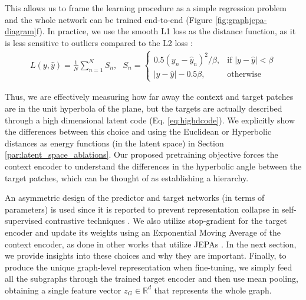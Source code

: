 \documentclass{article} \usepackage{iclr2024_conference,times}
\begin{document}
This allows us to frame the learning procedure as a simple regression problem and the whole network can be trained end-to-end (Figure \ref{fig:graphjepa-diagram}f). In practice, we use the smooth L1 loss as the distance function, as it is less sensitive to outliers compared to the L2 loss \citep{girshick2015fast}:
\begin{gather} \label{eq:loss-fn}
    L(y, \hat{y}) = \frac{1}{N} \sum_{n=1}^N S_n,~~~S_n = \begin{cases}
    0.5(y_n - \hat{y}_n)^2 / \beta, & \text{if } |y - \hat{y}| < \beta \\
    |y - \hat{y}| - 0.5\beta, & \text{otherwise}
\end{cases}
\end{gather}

Thus, we are effectively measuring how far away the context and target patches are in the unit hyperbola of the plane, but the targets are actually described through a high dimensional latent code (Eq. \ref{eq:highdcode}). We explicitly show the differences between this choice and using the Euclidean or Hyperbolic distances as energy functions (in the latent space) in Section \ref{par:latent_space_ablations}. Our proposed pretraining objective forces the context encoder to understand the differences in the hyperbolic angle between the target patches, which can be thought of as establishing a hierarchy. 

An asymmetric design of the predictor and target networks (in terms of parameters) is used since it is reported to prevent representation collapse in self-supervised contrastive techniques \citep{chen2020simple, baevski2022data2vec}. We also utilize stop-gradient for the target encoder and update its weights using an Exponential Moving Average of the context encoder, as done in other works that utilize JEPAs \citep{assran2023self,grill2020bootstrap,chen2021exploring}. In the next section, we provide insights into these choices and why they are important. Finally, to produce the unique graph-level representation when fine-tuning, we simply feed all the subgraphs through the trained target encoder and then use mean pooling, obtaining a single feature vector $z_G \in \mathbb{R}^d$ that represents the whole graph.
\end{document}
